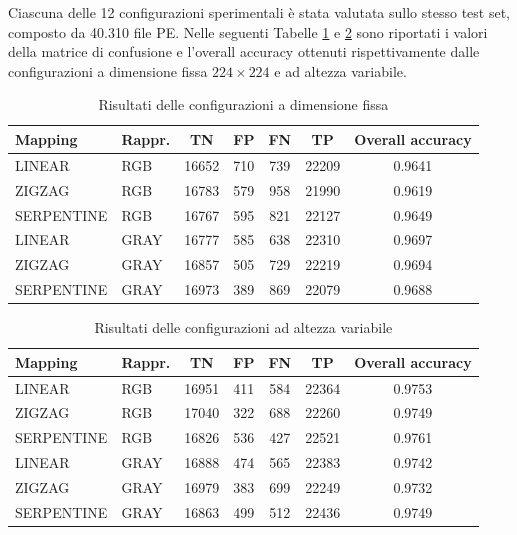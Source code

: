 Ciascuna delle 12 configurazioni sperimentali è stata valutata sullo
stesso test set, composto da 40.310 file PE. Nelle seguenti Tabelle
\ref{tab:risultati_fixed} e \ref{tab:risultati_variable} sono
riportati i valori della matrice di confusione e l'overall accuracy
ottenuti rispettivamente dalle configurazioni a dimensione fissa
$224 \times 224$ e ad altezza variabile.

\begin{table}[H]
    \centering
    \caption{Risultati delle configurazioni a dimensione fissa}
    \label{tab:risultati_fixed}
    \renewcommand{\arraystretch}{1.3}
    \begin{tabular}{llccccc}
        \toprule
        \textbf{Mapping} & \textbf{Rappr.} & \textbf{TN}
        & \textbf{FP} & \textbf{FN} & \textbf{TP}
        & \textbf{Overall accuracy} \\
        \midrule
        LINEAR     & RGB  & 16652 & 710 & 739 & 22209 & 0.9641 \\
        ZIGZAG     & RGB  & 16783 & 579 & 958 & 21990 & 0.9619 \\
        SERPENTINE & RGB  & 16767 & 595 & 821 & 22127 & 0.9649 \\
        \midrule
        LINEAR     & GRAY & 16777 & 585 & 638 & 22310 & 0.9697 \\
        ZIGZAG     & GRAY & 16857 & 505 & 729 & 22219 & 0.9694 \\
        SERPENTINE & GRAY & 16973 & 389 & 869 & 22079 & 0.9688 \\
        \bottomrule
    \end{tabular}
\end{table}

\begin{table}[H]
    \centering
    \caption{Risultati delle configurazioni ad altezza variabile}
    \label{tab:risultati_variable}
    \renewcommand{\arraystretch}{1.3}
    \begin{tabular}{llccccc}
        \toprule
        \textbf{Mapping} & \textbf{Rappr.} & \textbf{TN}
        & \textbf{FP} & \textbf{FN} & \textbf{TP}
        & \textbf{Overall accuracy} \\
        \midrule
        LINEAR     & RGB  & 16951 & 411 & 584 & 22364 & 0.9753 \\
        ZIGZAG     & RGB  & 17040 & 322 & 688 & 22260 & 0.9749 \\
        SERPENTINE & RGB  & 16826 & 536 & 427 & 22521 & 0.9761 \\
        \midrule
        LINEAR     & GRAY & 16888 & 474 & 565 & 22383 & 0.9742 \\
        ZIGZAG     & GRAY & 16979 & 383 & 699 & 22249 & 0.9732 \\
        SERPENTINE & GRAY & 16863 & 499 & 512 & 22436 & 0.9749 \\
        \bottomrule
    \end{tabular}
\end{table}

